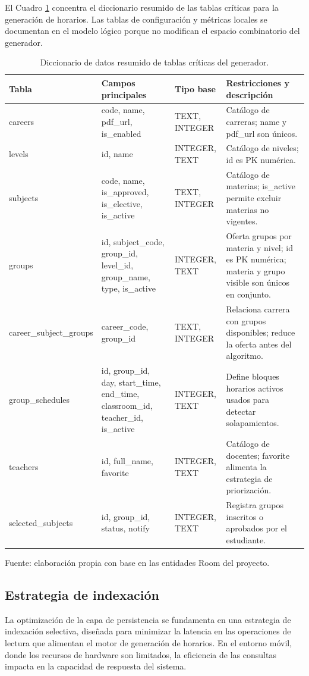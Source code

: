 El Cuadro \ref{tab:f2_diccionario_datos} concentra el diccionario resumido de las tablas críticas para la generación de horarios. Las tablas de configuración y métricas locales se documentan en el modelo lógico porque no modifican el espacio combinatorio del generador.

\begin{table}[H]
\centering
\begin{tabularx}{\linewidth}{@{}p{4.2cm} p{3.6cm} p{1.8cm} p{4.4cm}@{}}
\toprule
Tabla & Campos principales & Tipo base & Restricciones y descripción \\
\midrule
careers & code, name, pdf\_url, is\_enabled & TEXT, INTEGER & Catálogo de carreras; name y pdf\_url son únicos. \\
levels & id, name & INTEGER, TEXT & Catálogo de niveles; id es PK numérica. \\
subjects & code, name, is\_approved, is\_elective, is\_active & TEXT, INTEGER & Catálogo de materias; is\_active permite excluir materias no vigentes. \\
groups & id, subject\_code, group\_id, level\_id, group\_name, type, is\_active & INTEGER, TEXT & Oferta grupos por materia y nivel; id es PK numérica; materia y grupo visible son únicos en conjunto. \\
career\_subject\_groups & career\_code, group\_id & TEXT, INTEGER & Relaciona carrera con grupos disponibles; reduce la oferta antes del algoritmo. \\
group\_schedules & id, group\_id, day, start\_time, end\_time, classroom\_id, teacher\_id, is\_active & INTEGER, TEXT & Define bloques horarios activos usados para detectar solapamientos. \\
teachers & id, full\_name, favorite & INTEGER, TEXT & Catálogo de docentes; favorite alimenta la estrategia de priorización. \\
selected\_subjects & id, group\_id, status, notify & INTEGER, TEXT & Registra grupos inscritos o aprobados por el estudiante. \\
\bottomrule
\end{tabularx}
\caption{Diccionario de datos resumido de tablas críticas del generador.}\label{tab:f2_diccionario_datos}
Fuente: elaboración propia con base en las entidades Room del proyecto.
\end{table}

\subsection{Estrategia de indexación}
La optimización de la capa de persistencia se fundamenta en una estrategia de indexación selectiva, diseñada para minimizar la latencia en las operaciones de lectura que alimentan el motor de generación de horarios. En el entorno móvil, donde los recursos de hardware son limitados, la eficiencia de las consultas impacta en la capacidad de respuesta del sistema.


